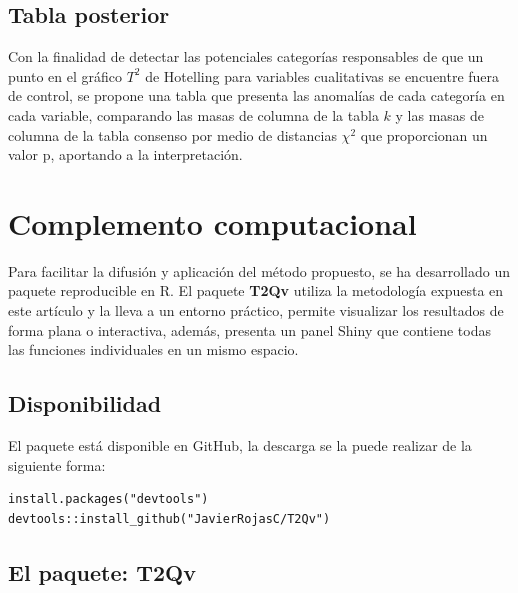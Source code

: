 \documentclass[water,article,submit,moreauthors,pdftex]{mdpi}
\begin{document}
\hypertarget{tabla-posterior}{%
\subsection{Tabla posterior}\label{tabla-posterior}}

Con la finalidad de detectar las potenciales categorías responsables de
que un punto en el gráfico \(T^2\) de Hotelling para variables
cualitativas se encuentre fuera de control, se propone una tabla que
presenta las anomalías de cada categoría en cada variable, comparando
las masas de columna de la tabla \(k\) y las masas de columna de la
tabla consenso por medio de distancias \(\chi^2\) que proporcionan un
valor p, aportando a la interpretación.

\hypertarget{complemento-computacional}{%
\section{Complemento computacional}\label{complemento-computacional}}

Para facilitar la difusión y aplicación del método propuesto, se ha
desarrollado un paquete reproducible en R. El paquete \textbf{T2Qv}
utiliza la metodología expuesta en este artículo y la lleva a un entorno
práctico, permite visualizar los resultados de forma plana o
interactiva, además, presenta un panel Shiny que contiene todas las
funciones individuales en un mismo espacio.

\hypertarget{disponibilidad}{%
\subsection{Disponibilidad}\label{disponibilidad}}

El paquete está disponible en GitHub, la descarga se la puede realizar
de la siguiente forma:

\begin{verbatim}
install.packages("devtools")
devtools::install_github("JavierRojasC/T2Qv")
\end{verbatim}

\hypertarget{el-paquete-t2qv}{%
\subsection{El paquete: T2Qv}\label{el-paquete-t2qv}}
\end{document}
